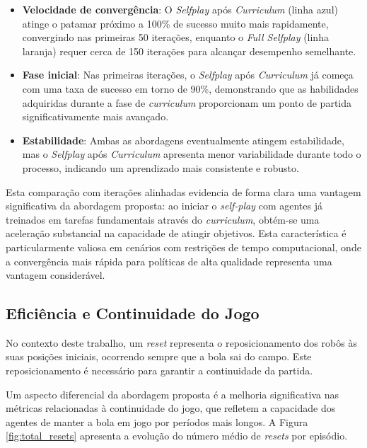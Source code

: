 \begin{itemize}
    \item \textbf{Velocidade de convergência}: O \textit{Selfplay} após \textit{Curriculum} (linha azul) atinge o patamar próximo a 100\% de sucesso muito mais rapidamente, convergindo nas primeiras 50 iterações, enquanto o \textit{Full Selfplay} (linha laranja) requer cerca de 150 iterações para alcançar desempenho semelhante.
    
    \item \textbf{Fase inicial}: Nas primeiras iterações, o \textit{Selfplay} após \textit{Curriculum} já começa com uma taxa de sucesso em torno de 90\%, demonstrando que as habilidades adquiridas durante a fase de \textit{curriculum} proporcionam um ponto de partida significativamente mais avançado.
    
    \item \textbf{Estabilidade}: Ambas as abordagens eventualmente atingem estabilidade, mas o \textit{Selfplay} após \textit{Curriculum} apresenta menor variabilidade durante todo o processo, indicando um aprendizado mais consistente e robusto.
\end{itemize}

Esta comparação com iterações alinhadas evidencia de forma clara uma vantagem significativa da abordagem proposta: ao iniciar o \textit{self-play} com agentes já treinados em tarefas fundamentais através do \textit{curriculum}, obtém-se uma aceleração substancial na capacidade de atingir objetivos. Esta característica é particularmente valiosa em cenários com restrições de tempo computacional, onde a convergência mais rápida para políticas de alta qualidade representa uma vantagem considerável.

\subsection{Eficiência e Continuidade do Jogo}

No contexto deste trabalho, um \textit{reset} representa o reposicionamento dos robôs às suas posições iniciais, ocorrendo sempre que a bola sai do campo. Este reposicionamento é necessário para garantir a continuidade da partida.

Um aspecto diferencial da abordagem proposta é a melhoria significativa nas métricas relacionadas à continuidade do jogo, que refletem a capacidade dos agentes de manter a bola em jogo por períodos mais longos. A Figura \ref{fig:total_resets} apresenta a evolução do número médio de \textit{resets} por episódio.

